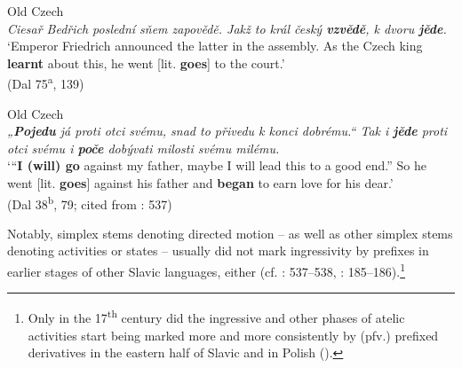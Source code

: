 \documentclass[output=paper,colorlinks,citecolor=brown]{langscibook}
\begin{document}
\ea \label{ex:wiemer:36} Old Czech\\
    \textit{Ciesař Bedřich poslední sňem zapovědě. Jakž to král český \textbf{vzvědě}, k dvoru \textbf{jěde}.}\\
    ‘Emperor Friedrich announced the latter in the assembly. As the Czech king \textbf{learnt} about this, he went [lit. \textbf{goes}] to the court.’\\
    \hfill (Dal 75\textsuperscript{a}, 139)
\z

\ea \label{ex:wiemer:37} Old Czech\\
    \textit{„\textbf{Pojedu} já proti otci svému, snad to přivedu k konci dobrému.“ Tak i \textbf{jěde} proti otci svému i \textbf{poče} dobývati milosti svému milému.}\\
   ‘“\textbf{I (will) go} against my father, maybe I will lead this to a good end.” So he went [lit. \textbf{goes}] against his father and \textbf{began} to earn love for his dear.’\\
    \hfill (Dal 38\textsuperscript{b}, 79; cited from \cite{Bondarko1961}: 537)
\z

Notably, simplex stems denoting directed motion – as well as other simplex stems denoting activities or states – usually did not mark ingressivity by prefixes in earlier stages of other Slavic languages, either (cf. \cite{Bondarko1961}: 537--538, \citealt{Dickey2011}: 185--186).\footnote{Only in the 17\textsuperscript{th} century did the ingressive and other phases of atelic activities start being marked more and more consistently by (pfv.) prefixed derivatives in the eastern half of Slavic and in Polish (\cite{Dickey2011}).}
\end{document}
